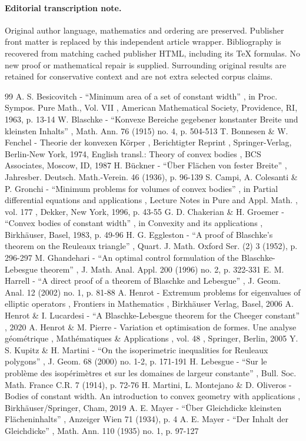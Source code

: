 \documentclass[11pt]{article}
\numberwithin{equation}{section}
\begin{document}
\paragraph{Editorial transcription note.}
Original author language, mathematics and ordering are preserved. Publisher front matter is replaced by this independent article wrapper. Bibliography is recovered from matching cached publisher HTML, including its TeX formulas. No new proof or mathematical repair is supplied. Surrounding original results are retained for conservative context and are not extra selected corpus claims.
\clearpage

\begin{thebibliography}{99}
 A. S. Besicovitch - “Minimum area of a set of constant width” , in Proc. Sympos. Pure Math., Vol. VII , American Mathematical Society, Providence, RI, 1963, p. 13-14
 W. Blaschke - “Konvexe Bereiche gegebener konstanter Breite und kleinsten Inhalts” , Math. Ann. 76 (1915) no. 4, p. 504-513
 T. Bonnesen \& W. Fenchel - Theorie der konvexen Körper , Berichtigter Reprint , Springer-Verlag, Berlin-New York, 1974, English transl.: Theory of convex bodies , BCS Associates, Moscow, ID, 1987
 H. Bückner - “Über Flächen von fester Breite” , Jahresber. Deutsch. Math.-Verein. 46 (1936), p. 96-139
 S. Campi, A. Colesanti \& P. Gronchi - “Minimum problems for volumes of convex bodies” , in Partial differential equations and applications , Lecture Notes in Pure and Appl. Math. , vol. 177 , Dekker, New York, 1996, p. 43-55
 G. D. Chakerian \& H. Groemer - “Convex bodies of constant width” , in Convexity and its applications , Birkhäuser, Basel, 1983, p. 49-96
 H. G. Eggleston - “A proof of Blaschke’s theorem on the Reuleaux triangle” , Quart. J. Math. Oxford Ser. (2) 3 (1952), p. 296-297
 M. Ghandehari - “An optimal control formulation of the Blaschke-Lebesgue theorem” , J. Math. Anal. Appl. 200 (1996) no. 2, p. 322-331
 E. M. Harrell - “A direct proof of a theorem of Blaschke and Lebesgue” , J. Geom. Anal. 12 (2002) no. 1, p. 81-88
 A. Henrot - Extremum problems for eigenvalues of elliptic operators , Frontiers in Mathematics , Birkhäuser Verlag, Basel, 2006
 A. Henrot \& I. Lucardesi - “A Blaschke-Lebesgue theorem for the Cheeger constant” , 2020
 A. Henrot \& M. Pierre - Variation et optimisation de formes. Une analyse géométrique , Mathématiques \& Applications , vol. 48 , Springer, Berlin, 2005
 Y. S. Kupitz \& H. Martini - “On the isoperimetric inequalities for Reuleaux polygons” , J. Geom. 68 (2000) no. 1-2, p. 171-191
 H. Lebesgue - “Sur le problème des isopérimètres et sur les domaines de largeur constante” , Bull. Soc. Math. France C.R. 7 (1914), p. 72-76
 H. Martini, L. Montejano \& D. Oliveros - Bodies of constant width. An introduction to convex geometry with applications , Birkhäuser/Springer, Cham, 2019
 A. E. Mayer - “Über Gleichdicke kleinsten Flächeninhalts” , Anzeiger Wien 71 (1934), p. 4
 A. E. Mayer - “Der Inhalt der Gleichdicke” , Math. Ann. 110 (1935) no. 1, p. 97-127
\end{thebibliography}
\end{document}
